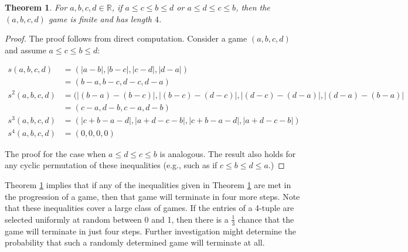 \documentclass[12pt]{amsart}
\newtheorem{theorem}{Theorem}[section]
\newcommand{\diff}{s}
\begin{document}
\begin{theorem}
\label{thm:inequalities}
For $a,b,c,d\in \mathbb{R}$, if $a \leq c \leq b \leq d$ or $a \leq d \leq c \leq b$, then the $(a,b,c,d)$ game is finite and has length $4$. 
\end{theorem}

\begin{proof}

The proof follows from direct computation. Consider a game $(a,b,c,d)$ and assume $a \leq c \leq b \leq d$:

\begin{align*}
\diff(a, b, c, d) &= (|a-b|, |b-c|, |c-d|, |d-a|) \\
&=(b-a, b-c, d-c, d-a)\\
\diff^2(a, b, c, d) &= (|(b-a) - (b-c)|, |(b-c) - (d-c)|, |(d-c) - (d-a)|, |(d-a) - (b-a)| \\
&= (c-a, d-b, c-a, d-b)\\
\diff^3(a, b, c, d) &= (|c + b - a - d|, |a + d - c - b|, |c + b - a - d|, |a + d - c - b|)\\
\diff^4(a, b, c, d) &= (0,0,0,0)
\end{align*}

The proof for the case when $a \leq d \leq c \leq b$ is analogous. The result also holds for any cyclic permutation of these inequalities (e.g., such as if $c \leq b \leq d \leq a$.)
\end{proof}

Theorem \ref{thm:inequalities} implies that if any of the inequalities given in Theorem \ref{thm:inequalities} are met in the progression of a game, then that game will terminate in four more steps. Note that these inequalities cover a large class of games. If the entries of a 4-tuple are selected uniformly at random between 0 and 1, then there is a $\frac{1}{3}$ chance that the game will terminate in just four steps. Further investigation might determine the probability that such a randomly determined game will terminate at all.
\end{document}

